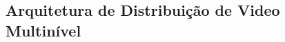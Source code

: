 


\subsection{Arquitetura de Distribuição de Video Multinível}
\label{subsec:sca-contrl-arch}

%
%
%
%

